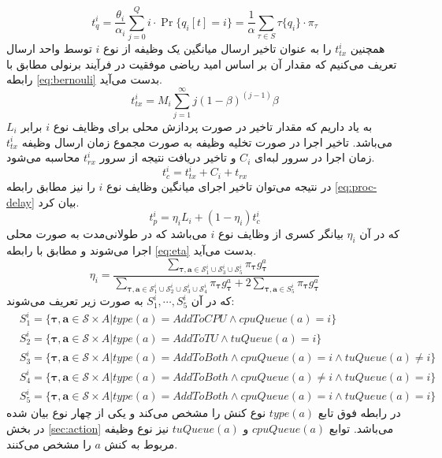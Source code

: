 \begin{equation}
	\label{eq:queuing-delay}
	t_{q}^i=\frac{\theta_i}{\alpha_i} \sum_{j=0}^{Q} i \cdot \operatorname{Pr}\{q_i[t]=i\}=\frac{1}{\alpha} \sum_{\tau \in S} \tau\{q_i\} \cdot \pi_{\tau}
\end{equation}
همچنین $t_{tx}^i$ را به عنوان تاخیر ارسال میانگین یک وظیفه از نوع \(i\) توسط واحد ارسال تعریف می‌کنیم که مقدار آن بر اساس امید ریاضی موفقیت در فرآیند برنولی مطابق با رابطه \ref{eq:bernouli} بدست می‌آید.
\begin{equation}
	\label{eq:bernouli}
	t_{t x}^i=M_i \sum_{j=1}^{\infty} j(1-\beta)^{(j-1)} \beta
\end{equation}
به یاد داریم که مقدار تاخیر در صورت پردازش محلی برای وظایف نوع $i$ برابر $L_i$ می‌باشد. تاخیر اجرا در صورت تخلیه وظیفه به صورت مجموع زمان ارسال وظیفه
$t_{tx}^i$
زمان اجرا در سرور لبه‌ای
$C_i$
و تاخیر دریافت نتیجه از سرور
$t_{rx}^i$
محاسبه می‌شود.
\begin{equation}
	t_{c}^i=t_{t x}^i+C_i+t_{rx}
\end{equation}
در نتیجه می‌توان تاخیر اجرای میانگین وظایف نوع $i$ را نیز مطابق رابطه \ref{eq:proc-delay} بیان کرد.
\begin{equation}
	\label{eq:proc-delay}
	t_{p}^i=\eta_i L_i+(1-\eta_i) t_{c}^i
\end{equation}
که در آن
$\eta_i$
بیانگر کسری از وظایف نوع $i$ می‌باشد که در طولانی‌مدت به صورت محلی اجرا می‌شوند و مطابق با رابطه \ref{eq:eta} بدست می‌آيد.
\begin{equation}
	\label{eq:eta}
	\eta_i=\frac{\sum_{\boldsymbol{\tau, a} \in \mathcal{S}_{1}^i\cup\mathcal{S}_{3}^i\cup\mathcal{S}_{5}^i} \pi_{\boldsymbol{\tau}} g_{\boldsymbol{\tau}}^{a} }{\sum_{\boldsymbol{\tau, a} \in \mathcal{S}_{1}^i\cup\mathcal{S}_{2}^i\cup\mathcal{S}_{3}^i\cup\mathcal{S}_{4}^i} \pi_{\boldsymbol{\tau}} g_{\boldsymbol{\tau}}^{a} + 2 \sum_{\boldsymbol{\tau, a} \in S_5^i} \pi_{\boldsymbol{\tau}} g_{\boldsymbol{\tau}}^{a}}
\end{equation}
که در آن
$S_1^i, \cdots, S_5^i$
به صورت زیر تعریف می‌شوند:
\begin{equation}
	\begin{aligned}
		& S_1^i = \{\boldsymbol{\tau, a} \in \mathcal{S} \times A | type(a) = AddToCPU \land cpuQueue(a) = i\} \\
		& S_2^i = \{\boldsymbol{\tau, a} \in \mathcal{S} \times A | type(a) = AddToTU \land tuQueue(a) = i\} \\ 
		& S_3^i = \{\boldsymbol{\tau, a} \in \mathcal{S} \times A | type(a) = AddToBoth \land cpuQueue(a) = i \land tuQueue(a) \neq i\} \\
		& S_4^i = \{\boldsymbol{\tau, a} \in \mathcal{S} \times A | type(a) = AddToBoth \land cpuQueue(a) \neq i \land tuQueue(a) = i\} \\
		& S_5^i = \{\boldsymbol{\tau, a} \in \mathcal{S} \times A | type(a) = AddToBoth \land cpuQueue(a) = i \land tuQueue(a) = i\}
	\end{aligned}
\end{equation}
در رابطه فوق تابع $type(a)$ نوع کنش را مشخص می‌کند و یکی از چهار نوع بیان شده در بخش \ref{sec:action} می‌باشد. توابع
$cpuQueue(a)$
و
$tuQueue(a)$
نیز نوع وظیفه مربوط به کنش $a$ را مشخص می‌کنند. \\


